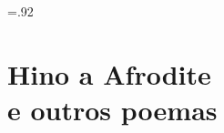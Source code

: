 
\setcounter{secnumdepth}{-2}
\setcounter{tocdepth}{0}


\pagebreak
\begingroup \footnotesize \parindent0pt \parskip 5pt \thispagestyle{empty} \vspace*{-0.5\textheight}\mbox{} \vfill
\baselineskip=.92\baselineskip

\endgroup

\pagebreak
{\begingroup\mbox{}\pagestyle{empty}
\pagestyle{empty} 
\tableofcontents*\clearpage\endgroup}



\part[hino a afrodite e outros poemas]{Hino a Afrodite\\ e outros poemas}


\clearpage
\blankpage
\hedrashorttoc

